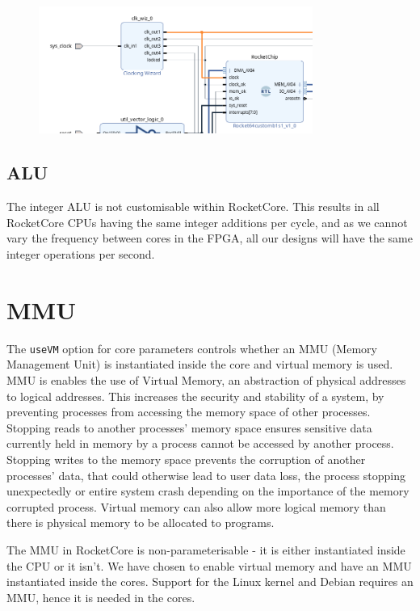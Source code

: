 \begin{figure}
    \includegraphics[width=0.8\textwidth]{./img/single_clock_rocketchip.png}
\end{figure}

\subsection{ALU}
The integer ALU is not customisable within RocketCore. This results in all RocketCore CPUs having the same integer additions per cycle, and as we cannot vary the frequency between cores in the FPGA, all our designs will have the same integer operations per second.

\subsection{}

\section{MMU}
The \texttt{useVM} option for core parameters controls whether an MMU (Memory Management Unit) is instantiated inside the core and virtual memory is used. MMU is enables the use of Virtual Memory, an abstraction of physical addresses to logical addresses. This increases the security and stability of a system, by preventing processes from accessing the memory space of other processes. Stopping reads to another processes' memory space ensures sensitive data currently held in memory by a process cannot be accessed by another process. Stopping writes to the memory space prevents the corruption of another processes' data, that could otherwise lead to user data loss, the process stopping unexpectedly or entire system crash depending on the importance of the memory corrupted process. Virtual memory can also allow more logical memory than there is physical memory to be allocated to programs.

The MMU in RocketCore is non-parameterisable - it is either instantiated inside the CPU or it isn't. We have chosen to enable virtual memory and have an MMU instantiated inside the cores. Support for the Linux kernel and Debian requires an MMU, hence it is needed in the cores. %

